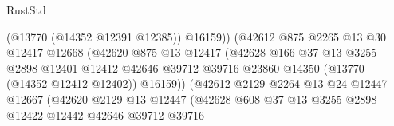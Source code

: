 \begin{lexlean}{RustStd}
\begin{coremodule}
                                            (@13770 (@14352 @12391 @12385))
                                            @16159))
                                        (@42612
                                          @875
                                          @2265
                                          @13
                                          @30
                                          @12417
                                          @12668
                                          (@42620
                                            @875
                                            @13
                                            @12417
                                            (@42628
                                              @166
                                              @37
                                              @13
                                              @3255
                                              @2898
                                              @12401
                                              @12412
                                              @42646
                                              @39712
                                              @39716
                                              @23860
                                              @14350
                                              (@13770 (@14352 @12412 @12402))
                                              @16159))
                                          (@42612
                                            @2129
                                            @2264
                                            @13
                                            @24
                                            @12447
                                            @12667
                                            (@42620
                                              @2129
                                              @13
                                              @12447
                                              (@42628
                                                @608
                                                @37
                                                @13
                                                @3255
                                                @2898
                                                @12422
                                                @12442
                                                @42646
                                                @39712
                                                @39716

\end{coremodule}
\end{lexlean}
